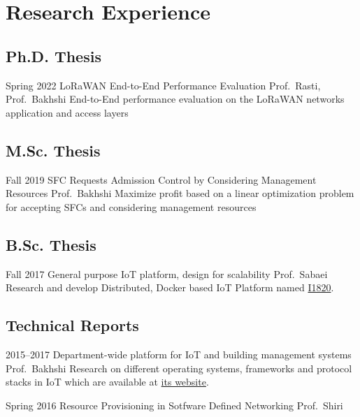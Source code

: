 \section{Research Experience}

\subsection{Ph.D. Thesis}

\cventry%
  {Spring 2022}
  {LoRaWAN End-to-End Performance Evaluation}
  {}
  {Prof.\ Rasti, Prof.\ Bakhshi}
  {}
  {End-to-End performance evaluation on the LoRaWAN networks application and access layers}

\subsection{M.Sc. Thesis}

\cventry%
  {Fall 2019}
  {SFC Requests Admission Control by Considering Management Resources}
  {}
  {Prof.\ Bakhshi}
  {}
  {Maximize profit based on a linear optimization problem for accepting SFCs and considering management resources}

\subsection{B.Sc. Thesis}

\cventry%
  {Fall 2017}
  {General purpose IoT platform, design for scalability}
  {}
  {Prof.\ Sabaei}
  {}{%
    Research and develop Distributed, Docker based IoT Platform named \href{https://github.com/I1820}{I1820}.
  }

\subsection{Technical Reports}

\cventry%
  {2015--2017}
  {Department-wide platform for IoT and building management systems}
  {}
  {Prof.\ Bakhshi}
  {}{%
    Research on different operating systems, frameworks and protocol stacks in IoT which are available at \href{https://aolab.github.io/}{its website}.
  }

\cventry%
  {Spring 2016}
  {Resource Provisioning in Sotfware Defined Networking}
  {}
  {}
  {Prof.\ Shiri}
  {}
